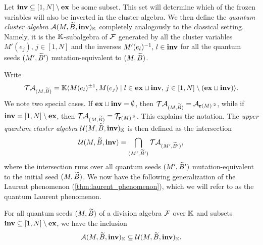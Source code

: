 Let $\mathbf{inv} \subseteq [1, N]\setminus \mathbf{ex}$ be some subset. This set will determine which
of the frozen variables will also be inverted in the cluster algebra. We then define
the \emph{quantum cluster algebra} $\mathcal{A}(M, \widetilde{B},
	\mathbf{inv})_{\mathbb{K}}$ completely analogously to the classical setting. Namely, it is the
$\mathbb{K}$-subalgebra of $\mathcal{F}$ generated by all the cluster variables $M'(e_j), \, j \in
	[1, N]$ and the inverses $M'(e_l)^{-1}, \, l \in \mathbf{inv}$ for all the quantum seeds $(M',
	\widetilde{B}')$ mutation-equivalent to $(M, \widetilde{B})$.

Write
\begin{equation*}
	\mathcal{T}\mathcal{A}_{(M, \widetilde{B})} = \mathbb{K}\langle M(e_l)^{\pm 1}, M(e_j) \mid l \in \mathbf{ex} \sqcup \mathbf{inv},\, j \in [1, N] \setminus (\mathbf{ex} \sqcup \mathbf{inv})\rangle.
\end{equation*}
%
We note two special cases. If $\mathbf{ex} \sqcup \mathbf{inv} = \emptyset$, then $\mathcal{T}\mathcal{A}_{(M, \widetilde{B})}
	= \mathcal{A}_{\mathbf{r}(M)^{\cdot 2}}$, while if $\mathbf{inv} = [1, N] \setminus \mathbf{ex}$, then
$\mathcal{T}\mathcal{A}_{(M, \widetilde{B})} = \mathcal{T}_{\mathbf{r}(M)^{\cdot 2}}$. This explains the notation. The
\emph{upper quantum cluster algebra} $\mathcal{U}(M, \widetilde{B},
	\mathbf{inv})_{\mathbb{K}}$ is then defined as the intersection
\begin{equation*}
	\mathcal{U}(M, \widetilde{B}, \mathbf{inv}) = \bigcap_{(M', \widetilde{B}')} \mathcal{T}\mathcal{A}_{(M', \widetilde{B}')} ,
\end{equation*}
%
where the intersection runs over all quantum seeds $(M', \widetilde{B}')$ mutation-equivalent to
the initial seed $(M, \widetilde{B})$. We now have the following generalization of the Laurent
phenomenon (\cref{thm:laurent_phenomenon}), which we will refer to as the quantum
Laurent phenomenon.
\begin{theorem}\label{thm:quantum_laurent}

	For all quantum seeds $(M, \widetilde{B})$ of a division algebra $\mathcal{F}$ over $\mathbb{K}$ and subsets
	$\mathbf{inv} \subseteq [1, N] \setminus \mathbf{ex}$, we have the inclusion
	\begin{equation*}
		\mathcal{A}(M, \widetilde{B}, \mathbf{inv})_{\mathbb{K}} \subseteq \mathcal{U}(M, \widetilde{B}, \mathbf{inv})_{\mathbb{K}}.
	\end{equation*}
\end{theorem}

